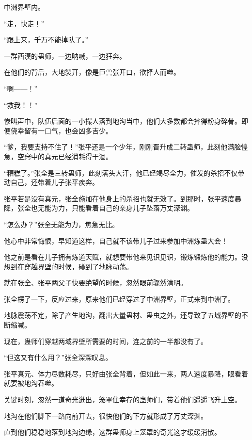 
\begin{this_body}

中洲界壁内。

“走，快走！”

“跟上来，千万不能掉队了。”

一群西漠的蛊师，一边呐喊，一边狂奔。

在他们的背后，大地裂开，像是巨兽张开口，欲择人而噬。

“啊——！”

“救我！！”

惨叫声中，队伍后面的一小撮人落到地沟当中，他们大多数都会摔得粉身碎骨。即便侥幸留有一口气，也会凶多吉少。

“爹，我要支持不住了！”张平还是一个少年，刚刚晋升成二转蛊师，此刻他满脸惶急，空窍中的真元已经消耗得干涸。

“糟糕了。”张全是三转蛊师，此刻满头大汗，他已经竭尽全力，催发的杀招不仅带动自己，还带着儿子张平疾奔。

张平若是没有真元，张全施加在他身上的杀招也就无效了。到那时，张平速度暴降，张全也无能为力，只能看着自己的亲身儿子坠落万丈深渊。

“怎么办？”张全无能为力，焦急无比。

他心中非常悔恨，早知道这样，自己就不该带儿子过来参加中洲炼蛊大会！

他之前是看在儿子拥有炼道天赋，就想要带他来见识见识，锻炼锻炼他的能力。没想到在穿越界壁的时候，碰到了地脉动荡。

就在张全、张平两父子快要绝望的时候，忽然眼前骤然清明。

张全楞了一下，反应过来，原来他们已经穿过了中洲界壁，正式来到中洲了。

地脉震荡不定，除了产生地沟，翻出大量蛊材、蛊虫之外，还导致了五域界壁的不断缩减。

现在，蛊师们穿越两域界壁所需要的时间，连之前的一半都没有了。

“但这又有什么用？”张全深深叹息。

张平真元、体力尽数耗尽，只好由张全背着，但如此一来，两人速度暴降，眼看着就要被地沟吞噬。

关键时刻，忽然一道奇光迸出，笼罩住幸存的蛊师们，带着他们遥遥飞升上空。

地沟在他们脚下一路向前开去，很快他们的下方就形成了万丈深渊。

直到他们稳稳地落到地沟边缘，这群蛊师身上笼罩的奇光这才缓缓消散。


\end{this_body}

